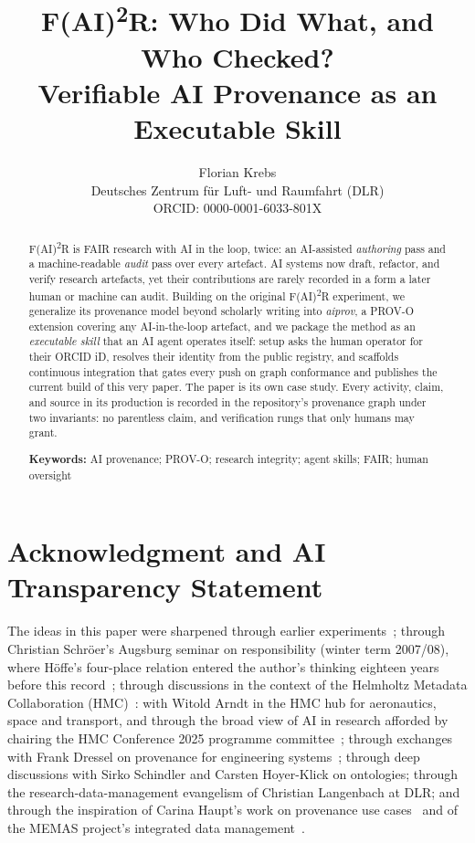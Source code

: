 \documentclass[11pt,a4paper]{article}
\title{F(AI)\textsuperscript{2}R: Who Did What, and Who Checked?\\
\large Verifiable AI Provenance as an Executable Skill}
\author{Florian Krebs\\
\normalsize Deutsches Zentrum f\"ur Luft- und Raumfahrt (DLR)\\
\normalsize ORCID: 0000-0001-6033-801X}
\date{}
\renewcommand{\cite}{\citep} %
\begin{document}
\linenumbers
\maketitle

\begin{abstract}
\noindent
F(AI)\textsuperscript{2}R is FAIR research with AI in the loop,
twice: an AI-assisted \emph{authoring} pass and a machine-readable
\emph{audit} pass over every artefact. AI systems now draft, refactor,
and verify research artefacts, yet their
contributions are rarely recorded in a form a later human or machine can
audit. Building on the original F(AI)\textsuperscript{2}R
experiment, we generalize its provenance model beyond scholarly writing into
\emph{aiprov}, a PROV-O extension covering any AI-in-the-loop artefact,
and we package the method as an \emph{executable skill} that an AI agent
operates itself: setup asks the human operator for their ORCID iD,
resolves their identity from the public registry, and scaffolds continuous
integration that gates every push on graph conformance and publishes the
current build of this very paper. The paper is its own case study. Every
activity, claim, and source in its production is recorded in the
repository's provenance graph under two invariants: no parentless claim,
and verification rungs that only humans may grant.

\medskip
\noindent\textbf{Keywords:} AI provenance; PROV-O; research integrity;
agent skills; FAIR; human oversight
\end{abstract}










\section*{Acknowledgment and AI Transparency Statement}
The ideas in this paper were sharpened through earlier
experiments~\cite{obscurity-is-dead, fair2r-repo}; through
Christian Schr\"oer's Augsburg seminar on responsibility (winter
term 2007/08), where H\"offe's four-place relation entered the
author's thinking eighteen years before this
record~\cite{verantwortung2008}; through discussions
in the context of the Helmholtz Metadata Collaboration
(HMC)~\cite{hmc}: with Witold Arndt in the HMC hub for
aeronautics, space and transport, and through the broad view of AI in
research afforded by chairing the HMC Conference 2025 programme
committee~\cite{hmc-conference2025}; through exchanges with Frank
Dressel on provenance for engineering
systems~\cite{uncertainty-prov2026}; through deep discussions with
Sirko Schindler and Carsten Hoyer-Klick on ontologies; through the
research-data-management evangelism of Christian Langenbach at DLR;
and through the inspiration of Carina Haupt's work on provenance
use cases~\cite{provenance-overview2022} and of the MEMAS project's
integrated data management~\cite{memas2024}.
\end{document}
